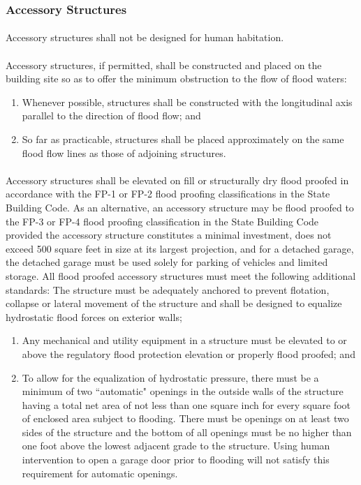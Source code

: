 \subsubsection{Accessory Structures}
\paragraph{}
Accessory structures shall not be designed for human habitation.
\paragraph{}
Accessory structures, if permitted, shall be constructed and placed on the building site so as to offer the minimum obstruction to the flow of flood waters:
\begin{enumerate}[{\indent}1)]
    \item Whenever possible, structures shall be constructed with the longitudinal axis parallel to the direction of flood flow; and
    \item So far as practicable, structures shall be placed approximately on the same flood flow lines as those of adjoining structures.
\end{enumerate}
\paragraph{}
Accessory structures shall be elevated on fill or structurally dry flood proofed in accordance with the FP-1 or FP-2 flood proofing classifications in the State Building Code. As an alternative, an accessory structure may be flood proofed to the FP-3 or FP-4 flood proofing classification in the State Building Code provided the accessory structure constitutes a minimal investment, does not exceed 500 square feet in size at its largest projection, and for a detached garage, the detached garage must be used solely for parking of vehicles and limited storage. All flood proofed accessory structures must meet the following additional standards: The structure must be adequately anchored to prevent flotation, collapse or lateral movement of the structure and shall be designed to equalize hydrostatic flood forces on exterior walls;
\begin{enumerate}[{\indent}1)]
    \item Any mechanical and utility equipment in a structure must be elevated to or above the regulatory flood protection elevation or properly flood proofed; and
    \item To allow for the equalization of hydrostatic pressure, there must be a minimum of two “automatic" openings in the outside walls of the structure having a total net area of not less than one square inch for every square foot of enclosed area subject to flooding. There must be openings on at least two sides of the structure and the bottom of all openings must be no higher than one foot above the lowest adjacent grade to the structure. Using human intervention to open a garage door prior to flooding will not satisfy this requirement for automatic openings.
\end{enumerate}

